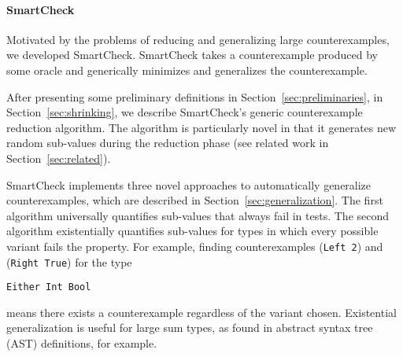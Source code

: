 \documentclass{sigplanconf}
\newenvironment{code}{\begin{alltt}\footnotesize}{\end{alltt}}
\newcommand{\ttp}[1]{\texttt{#1}}
\begin{document}
\paragraph{SmartCheck}
Motivated by the problems of reducing and generalizing large counterexamples, we
developed SmartCheck.  SmartCheck takes a counterexample produced by some
oracle and generically minimizes and generalizes the counterexample.


After presenting some preliminary definitions in
Section~\ref{sec:preliminaries}, in Section~\ref{sec:shrinking}, we describe
SmartCheck's generic counterexample reduction algorithm.  The algorithm is
particularly novel in that it generates new random sub-values during the
reduction phase (see related work in Section~\ref{sec:related}).



SmartCheck implements three novel approaches to automatically generalize
counterexamples, which are described in Section~\ref{sec:generalization}.  The
first algorithm universally quantifies sub-values that always fail in tests.
The second algorithm existentially quantifies sub-values for types in which
every possible variant fails the property.  For example, finding counterexamples
(\ttp{Left 2}) and (\ttp{Right True}) for the type
%
\begin{code}
\ttp{Either Int Bool}
\end{code}
%
\noindent
means there exists a counterexample regardless of the variant chosen.
Existential generalization is useful for large sum types, as found in
abstract syntax tree (AST) definitions, for example.
\end{document}
